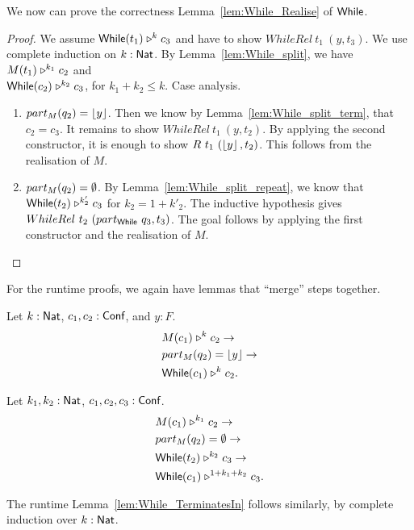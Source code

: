 We now can prove the correctness Lemma~\ref{lem:While_Realise} of $\textsf{While}$.
\begin{proof}
  We assume $\textsf{While}(t_1) \mathrel{\triangleright}^k c_3$ and have to show $WhileRel~t_1~(y, t_3)$.  We use complete induction on $k:\textsf{Nat}$.  By
  Lemma~\ref{lem:While_split}, we have $M(t_1) \mathrel{\triangleright}^{k_1} c_2$ and\\ $\textsf{While}(c_2) \mathrel{\triangleright}^{k_2} c_3$, for $k_1+k_2 \leq k$.  Case
  analysis.
  \begin{enumerate}
  \item $part_M(q_2) = \left\lfloor {y} \right\rfloor$.  Then we know by Lemma~\ref{lem:While_split_term}, that $c_2=c_3$.  It remains to show $WhileRel~t_1~(y, t_2)$.  By
    applying the second constructor, it is enough to show $R~t_1~(\left\lfloor {y} \right\rfloor, t_2)$.  This follows from the realisation of $M$.
  \item $part_M(q_2) = \emptyset$.  By Lemma~\ref{lem:While_split_repeat}, we know that $\textsf{While}(t_2) \mathrel{\triangleright}^{k'_2} c_3$ for $k_2 = 1 + k'_2$.  The
    inductive hypothesis gives $WhileRel~t_2~(part_{\textsf{While}}~q_3, t_3)$.  The goal follows by applying the first constructor and the realisation of $M$.
  \end{enumerate}
\end{proof}


For the runtime proofs, we again have lemmas that ``merge'' steps together.

\begin{lemma}
  Let $k : \textsf{Nat}$, $c_1, c_2 : \textsf{Conf}$, and $y:F$.
  \begin{alignat*}{1}
    & M(c_1) \mathrel{\triangleright}^k c_2 \rightarrow \\
    & part_M(q_2) = \left\lfloor {y} \right\rfloor \rightarrow \\
    & \textsf{While}(c_1) \mathrel{\triangleright}^k c_2.
  \end{alignat*}
\end{lemma}
\begin{lemma}
  Let $k_1, k_2 : \textsf{Nat}$, $c_1, c_2, c_3 : \textsf{Conf}$.
  \begin{alignat*}{1}
    & M(c_1) \mathrel{\triangleright}^{k_1} c_2 \rightarrow \\
    & part_M(q_2) = \emptyset \rightarrow \\
    & \textsf{While}(t_2) \mathrel{\triangleright}^{k_2} c_3 \rightarrow \\
    & \textsf{While}(c_1) \mathrel{\triangleright}^{1+k_1+k_2} c_3.
  \end{alignat*}
\end{lemma}

The runtime Lemma~\ref{lem:While_TerminatesIn} follows similarly, by complete induction over $k:\textsf{Nat}$.



